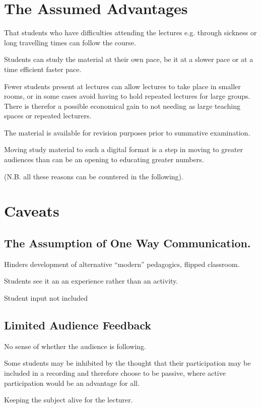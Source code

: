 \documentclass[a4paper,10pt]{article}
\begin{document}
\section{The Assumed Advantages}
That students who have difficulties attending the lectures e.g. through sickness or long travelling times can follow the course.

Students can study the material at their own pace, be it at a slower pace or at a time efficient faster pace.

Fewer students present at lectures can allow lectures to take place in smaller rooms, or in some cases avoid having to hold repeated lectures for large groups. There is therefor a possible economical gain to not needing as large teaching spaces or repeated lecturers.

The material is available for revision purposes prior to summative examination.

Moving study material to such a digital format is a step in moving to greater audiences than can be an opening to educating greater numbers.

(N.B. all these reasons can be countered in the following).

\section{Caveats}

\subsection{The Assumption of One Way Communication. }
Hinders development of alternative “modern” pedagogics, flipped classroom.

Students see it an an experience rather than an activity.

Student input not included


\subsection{Limited Audience Feedback}
No sense of whether the audience is following.

Some students may be inhibited by the thought that their participation may be included in a recording and therefore choose to be passive, where active participation would be an advantage for all.

Keeping the subject alive for the lecturer.
\end{document}
